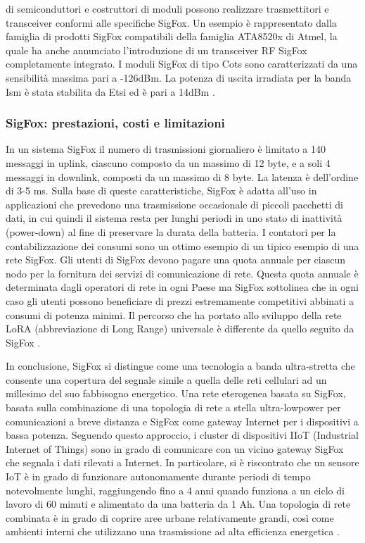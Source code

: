 \documentclass[a4paper]{report} %
\begin{document}
di semiconduttori e costruttori di moduli possono realizzare trasmettitori e transceiver conformi alle specifiche SigFox. Un esempio è rappresentato dalla famiglia di prodotti SigFox compatibili della famiglia ATA8520x di Atmel, la quale ha anche annunciato l'introduzione di un transceiver RF SigFox completamente integrato. I moduli SigFox di tipo Cots sono caratterizzati da una sensibilità massima pari a -126dBm. La potenza di uscita irradiata per la banda Ism è stata stabilita da Etsi ed è pari a 14dBm \cite{art:rif.23}.

\subsubsection{SigFox: prestazioni, costi e limitazioni}
In un sistema SigFox il numero di trasmissioni giornaliero è limitato a 140 messaggi in uplink, ciascuno composto da un massimo di 12 byte, e a soli 4 messaggi in downlink, composti da un massimo di 8 byte. La latenza è dell'ordine di 3-5 ms. Sulla base di queste caratteristiche, SigFox è adatta all'uso in applicazioni che prevedono una trasmissione occasionale di piccoli pacchetti di dati, in cui quindi il sistema resta per lunghi periodi in uno stato di inattività (power-down) al fine di preservare la durata della batteria. I contatori per la contabilizzazione dei consumi sono un ottimo esempio di un tipico esempio di una rete SigFox. Gli utenti di SigFox devono pagare una quota annuale per ciascun nodo per la fornitura dei servizi di comunicazione di rete. Questa quota annuale è determinata dagli operatori di rete in ogni Paese ma SigFox sottolinea che in ogni caso gli utenti possono beneficiare di prezzi estremamente competitivi abbinati a consumi di potenza minimi. Il percorso che ha portato allo sviluppo della rete LoRA (abbreviazione di Long Range) universale è differente da quello seguito da SigFox \cite{art:rif.23}.

In conclusione, SigFox si distingue come una tecnologia a banda ultra-stretta che consente una copertura del segnale simile a quella delle reti cellulari ad un millesimo del suo fabbisogno energetico. Una rete eterogenea basata su SigFox, basata sulla combinazione di una topologia di rete a stella ultra-lowpower per comunicazioni a breve distanza e SigFox come gateway Internet per i dispositivi a bassa potenza. Seguendo questo approccio, i cluster di dispositivi IIoT (Industrial Internet of Things) sono in grado di comunicare con un vicino gateway SigFox che segnala i dati rilevati a Internet. In particolare, si è riscontrato che un sensore IoT è in grado di funzionare autonomamente durante periodi di tempo notevolmente lunghi, raggiungendo fino a 4 anni quando funziona a un ciclo di lavoro di 60 minuti e alimentato da una batteria da 1 Ah. Una topologia di rete combinata è in grado di coprire aree urbane relativamente grandi, così come ambienti interni che utilizzano una trasmissione ad alta efficienza energetica \cite{art:rif.42}. 
\end{document}
